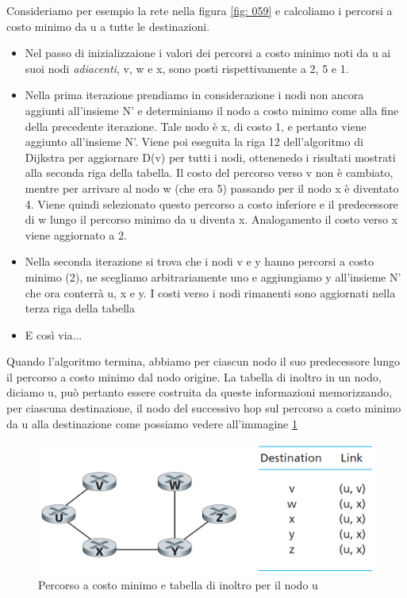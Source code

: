 \documentclass[11pt,a4paper]{book}
\begin{document}
Consideriamo per esempio la rete nella figura \ref{fig: 059} e calcoliamo i percorsi a costo minimo da u a tutte le destinazioni.
\begin{itemize}
	\item Nel passo di inizializzaione i valori dei percorsi a costo minimo noti da u ai suoi nodi \emph{adiacenti}, v, w e x, sono posti rispettivamente a 2, 5 e 1.
	\item Nella prima iterazione prendiamo in considerazione i nodi non ancora aggiunti all'insieme N' e determiniamo il nodo a costo minimo come alla fine della precedente iterazione. Tale nodo è x, di costo 1, e pertanto viene aggiunto all'insieme N'. Viene poi eseguita la riga 12 dell'algoritmo di Dijkstra per aggiornare D(v) per tutti i nodi, ottenenedo i risultati mostrati alla seconda riga della tabella. Il costo del percorso verso v non è cambiato, mentre per arrivare al nodo w (che era 5) passando per il nodo x è diventato 4. Viene quindi selezionato questo percorso a costo inferiore e il predecessore di w lungo il percorso minimo da u diventa x. Analogamento il costo verso x viene aggiornato a 2.
	\item Nella seconda iterazione si trova che i nodi v e y hanno percorsi a costo minimo (2), ne scegliamo arbitrariamente uno e aggiungiamo y all'insieme N' che ora conterrà u, x e y. I costi verso i nodi rimanenti sono aggiornati nella terza riga della tabella
	\item E così via...
\end{itemize}
Quando l'algoritmo termina, abbiamo per ciascun nodo il suo predecessore lungo il percorso a costo minimo dal nodo origine. La tabella di inoltro in un nodo, diciamo u, può pertanto essere costruita da queste informazioni memorizzando, per ciascuna destinazione, il nodo del successivo hop sul percorso a costo minimo da u alla destinazione come possiamo vedere all'immagine \ref{fig: 062}
\begin{figure}
	\includegraphics[scale=0.6]{img/062.png}
	\caption{Percorso a costo minimo e tabella di inoltro per il nodo u}
	\label{fig: 062}
\end{figure}
\end{document}

